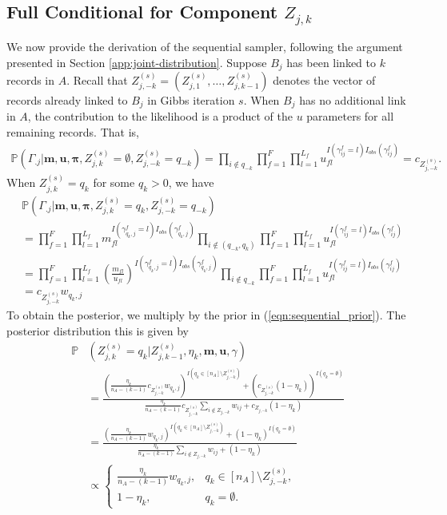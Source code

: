 \documentclass[12pt,letterpaper]{article}
\newcommand{\1}[1]{\mathbb{I}\!\left[#1\right]} %
\begin{document}
\subsection{Full Conditional for Component $Z_{j, k}$} \label{app:sequential-sampler}
We now provide the derivation of the sequential sampler, following the argument presented in Section \ref{app:joint-distribution}. Suppose $B_j$ has been linked to $k$ records in $A$. Recall that $Z_{j, -k}^{(s)} = (Z_{j, 1}^{(s)}, \ldots, Z_{j, k-1}^{(s)})$ denotes the vector of records already linked to $B_j$ in Gibbs iteration $s$. When $B_j$ has no additional link in $A$, the contribution to the likelihood is a product of the $u$ parameters for all remaining records. That is, 
\begin{align*}
	\mathbb{P}(\Gamma_{.j}| \bm{m}, \bm{u}, \bm{\pi}, Z_{j, k}^{(s)} = \emptyset, Z_{j, -k}^{(s)} = q_{-k}) = \prod_{i \notin q_{-k}} \prod_{f=1}^{F}\prod_{l=1}^{L_f} u_{fl}^{I(\gamma_{ij}^f = l)I_{obs}(\gamma_{ij}^f)} = c_{Z_{j, -k}^{(s)}}.
\end{align*}
When $Z_{j, k}^{(s)} = q_k$ for some $q_k > 0$, we have
\begin{align*}
	&\mathbb{P}(\Gamma_{.j}| \bm{m}, \bm{u}, \bm{\pi},  Z_{j, k}^{(s)} = q_k, Z_{j, -k}^{(s)} = q_{-k}) \\ &=\prod_{f=1}^{F}\prod_{l=1}^{L_f} m_{fl}^{I(\gamma_{q_k, j}^f = l)I_{obs}(\gamma_{q_k, j}^f)}  \prod_{i \notin (q_{-k}, q_k)}\prod_{f=1}^{F}\prod_{l=1}^{L_f} u_{fl}^{I(\gamma_{ij}^f = l)I_{obs}(\gamma_{ij}^f)} \\
	&=\prod_{f=1}^{F}\prod_{l=1}^{L_f} \left(\frac{m_{fl}}{u_{fl}} \right)^{I(\gamma_{q_k, j}^f = l)I_{obs}(\gamma_{q_k, j}^f)}  \prod_{i \notin q_{-k}}\prod_{f=1}^{F}\prod_{l=1}^{L_f} u_{fl}^{I(\gamma_{ij}^f = l)I_{obs}(\gamma_{ij}^f)} \\
	&= c_{Z_{j, -k}^{(s)}} w_{q_k, j}
\end{align*}
To obtain the posterior, we multiply by the prior in (\ref{eqn:sequential_prior}). The posterior distribution this is given by
\begin{align*} %
	\mathbb{P}&(Z_{j, k}^{(s)} = q_k|Z_{j, k-1}^{(s)}, \eta_k, \bm{m}, \bm{u}, \gamma) \\
	&= \frac{\left(\frac{\eta_k}{n_A - (k - 1)}c_{Z_{j, -k}^{(s)}} w_{q_k, j}\right)^{I(q_k \in [n_A] \setminus Z_{j, -k}^{(s)})} + \left(c_{Z_{j, -k}^{(s)}}(1 - \eta_k)\right)^{I(q_k = \emptyset)}}{\frac{\eta_k}{n_A - (k - 1)}c_{Z_{j, -k}^{(s)}} \sum_{i \notin Z_{j, -k}} w_{ij} + c_{Z_{j, -k}}(1 - \eta_k)} \\
	&=
	\frac{\left(\frac{\eta_k}{n_A - (k - 1)}w_{q_k, j}\right)^{I(q_k \in [n_A] \setminus Z_{j, -k}^{(s)})} + (1 - \eta_k)^{I(q_k = \emptyset)}}{\frac{\eta_k}{n_A - (k - 1)}\sum_{i \notin Z_{j, -k}} w_{ij} +(1 - \eta_k)} \\
	&\propto \begin{cases}
		\frac{\eta_k}{n_A - (k - 1)} w_{q_k, j}, & q_k \in [n_A] \setminus Z_{j, -k}^{(s)}, \\
		1 - \eta_k, & q_k= \emptyset.
	\end{cases}
\end{align*}
\end{document}
